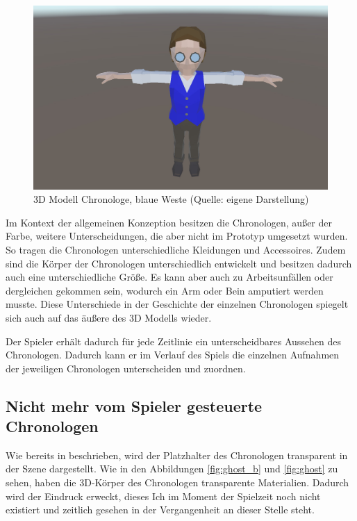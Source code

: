 \begin{figure}[ht]
\centering
\includegraphics[width=0.8\linewidth]{content/pictures/Chronologe_b.jpg}
\caption{3D Modell Chronologe, blaue Weste (Quelle: eigene Darstellung)}
\label{fig:chronologe_b}
\end{figure}

Im Kontext der allgemeinen Konzeption besitzen die Chronologen, außer der Farbe, weitere Unterscheidungen, die aber nicht im Prototyp umgesetzt wurden. So tragen die Chronologen unterschiedliche Kleidungen und Accessoires. Zudem sind die Körper der Chronologen unterschiedlich entwickelt und besitzen dadurch auch eine unterschiedliche Größe. Es kann aber auch zu Arbeitsunfällen oder dergleichen gekommen sein, wodurch ein Arm oder Bein amputiert werden musste. Diese Unterschiede in der Geschichte der einzelnen Chronologen spiegelt sich auch auf das äußere des \ac{3D} Modells wieder. 

Der Spieler erhält dadurch für jede Zeitlinie ein unterscheidbares Aussehen des Chronologen. Dadurch kann er im Verlauf des Spiels die einzelnen Aufnahmen der jeweiligen Chronologen unterscheiden und zuordnen.

\subsection{Nicht mehr vom Spieler gesteuerte Chronologen}
Wie bereits in  beschrieben, wird der Platzhalter des Chronologen transparent in der Szene dargestellt. Wie in den Abbildungen \ref{fig:ghost_b} und \ref{fig:ghost} zu sehen, haben die \ac{3D}-Körper des Chronologen transparente Materialien. Dadurch wird der Eindruck erweckt, dieses Ich im Moment der Spielzeit noch nicht existiert und zeitlich gesehen in der Vergangenheit an dieser Stelle steht.

